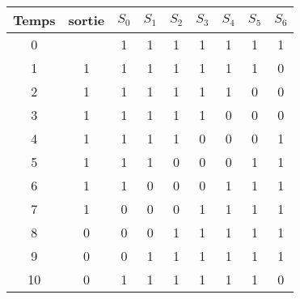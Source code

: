 \documentclass[a4paper,10pt]{article}
\begin{document}
\begin{enumerate}
\begin{enumerate}
		\begin{table}[h]
		\centering
		\begin{tabular}{|c|c|c|c|c|c|c|c|c|}
			\hline
			\rowcolor[HTML]{EFEFEF} \hline
			\cellcolor[HTML]{EFEFEF}\textbf{Temps}  & \cellcolor[HTML]{EFEFEF}\textbf{sortie} & \cellcolor[HTML]{EFEFEF}\textbf{$ S_{0} $} & \cellcolor[HTML]{EFEFEF}\textbf{$ S_{1} $} & \cellcolor[HTML]{EFEFEF}\textbf{$ S_{2} $} & \textbf{$ S_{3} $} & \textbf{$ S_{4} $} & \textbf{$ S_{5} $} & \textbf{$ S_{6} $}\\ \hline
			0 &   & 1 & 1 & 1  &  1 & 1 & 1 & 1 \\ \hline
			1 & 1 & 1 & 1 & 1 & 1 & 1 & 1 & 0 \\ \hline
			2 & 1 & 1 & 1 & 1 & 1 & 1 & 0 & 0 \\ \hline
			3 & 1 & 1 & 1 & 1 & 1 & 0 & 0 & 0\\ \hline
			4 & 1 & 1 & 1 & 1 &  0 & 0 & 0 & 1 \\ \hline
			5 & 1 & 1 & 1 & 0& 0 & 0 & 1 & 1\\ \hline
			6 & 1 & 1 & 0 & 0&  0 & 1 & 1 &1 \\ \hline
			7 & 1 & 0 & 0 & 0&  1 & 1 & 1 &1 \\ \hline
			8 & 0 & 0 & 0 & 1&  1 & 1 & 1 &1 \\ \hline
			9 & 0 & 0 & 1 & 1&  1 & 1 & 1 &1 \\ \hline
			10 &0 & 1 & 1 & 1&  1 & 1 & 1 &0 \\ \hline
	\end{tabular}
	\end{table}

		
	\end{enumerate}
\end{enumerate}



 
\end{document}
